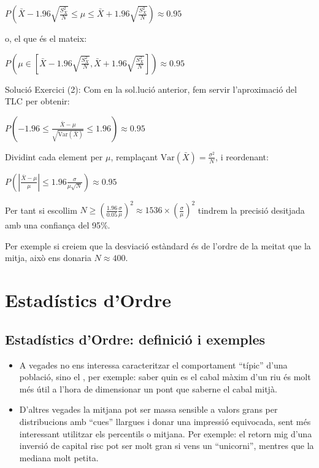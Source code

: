 \documentclass[letterpaper,10pt,english]{sphinxmanual}
\begin{document}
\(P(\bar{X} -1.96\sqrt{\frac{S^2_X}{N}} \leq  \mu \leq \bar{X} + 1.96\sqrt{\frac{S^2_X}{N}}) \approx 0.95\)

o, el que és el mateix:

\(P(\mu \in \left[\bar{X} -1.96\sqrt{\frac{S^2_X}{N}}, \bar{X} + 1.96\sqrt{\frac{S^2_X}{N}}\right]) \approx 0.95\)

Solució Exercici (2): Com en la sol.lució anterior, fem servir l’aproximació del TLC per obtenir:

\(P(-1.96 \leq \frac{\bar{X} - \mu}{\sqrt{\mbox{Var}(\bar{X})}} \leq 1.96) \approx 0.95\)

Dividint cada element per \(\mu\), remplaçant \(\mbox{Var}(\bar{X}) = \frac{\sigma^2}{N}\), i reordenant:

\(P( \left|\frac{\bar{X} - \mu}{\mu}\right| \leq 1.96 \frac{\sigma}{\mu\sqrt{N}}) \approx 0.95\)

Per tant si escollim \(N \geq \left(\frac{1.96}{0.05}\frac{\sigma}{\mu}\right)^2 \approx 1536 \times \left(\frac{\sigma}{\mu}\right)^2\) tindrem la precisió desitjada amb una confiança del 95\%.

Per exemple si creiem que la desviació estàndard és de l’ordre de la meitat que la mitja,
això ens donaria \(N \approx 400\).


\section{Estadístics d’Ordre}
\label{\detokenize{0_Intro/0_2_Intro_stats:estadistics-d-ordre}}

\subsection{Estadístics d’Ordre: definició i exemples}
\label{\detokenize{0_Intro/0_2_Intro_stats:estadistics-d-ordre-definicio-i-exemples}}\begin{itemize}
\item {} 
A vegades no ens interessa caracteritzar el comportament “típic” d’una població, sino el , per exemple: saber quin es el cabal màxim d’un riu és molt més útil a l’hora de dimensionar un pont que saber\sphinxhyphen{}ne el cabal mitjà.

\item {} 
D’altres vegades la mitjana pot ser massa sensible a valors grans per distribucions amb “cues” llargues i donar una impressió equivocada, sent més interessant utilitzar els percentils o mitjana. Per exemple: el retorn mig d’una inversió de capital risc pot ser molt gran si vens un “unicorni”, mentres que la mediana molt petita.

\end{itemize}
\end{document}
